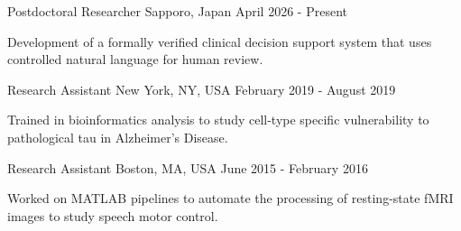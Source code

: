 %
%
%

\vspace*{0.4cm}

\begin{cventries}

    {Postdoctoral Researcher}
    {Sapporo, Japan}
    {April 2026 - Present}
    {\begin{cvitems}
        \item Development of a formally verified clinical decision support system that uses controlled natural language for human review.
    \end{cvitems}\vspace{1.5\baselineskip}}

    \vspace*{0.1cm}

    {Research Assistant}
    {New York, NY, USA}
    {February 2019 - August 2019}
    {\begin{cvitems}
        \item Trained in bioinformatics analysis to study cell-type specific vulnerability to pathological tau in Alzheimer's Disease.
    \end{cvitems}\vspace{1.5\baselineskip}}

    \vspace*{0.1cm}

    {Research Assistant}
    {Boston, MA, USA}
    {June 2015 - February 2016}
    {\begin{cvitems}
        \item Worked on MATLAB pipelines to automate the processing of resting-state fMRI images to study speech motor control.
    \end{cvitems}\vspace{1.5\baselineskip}}

\end{cventries}

\vspace*{-0.4cm}
